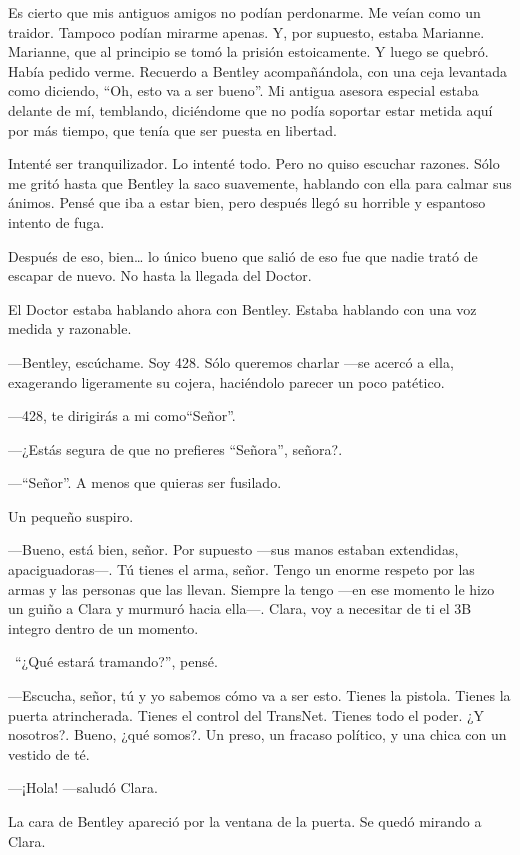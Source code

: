 Es cierto que mis antiguos amigos no podían perdonarme. Me veían como un
traidor. Tampoco podían mirarme apenas. Y, por supuesto, estaba
Marianne. Marianne, que al principio se tomó la prisión estoicamente. Y
luego se quebró. Había pedido verme. Recuerdo a Bentley acompañándola,
con una ceja levantada como diciendo, ``Oh, esto va a ser bueno''. Mi
antigua asesora especial estaba delante de mí, temblando, diciéndome que
no podía soportar estar metida aquí por más tiempo, que tenía que ser
puesta en libertad.

Intenté ser tranquilizador. Lo intenté todo. Pero no quiso escuchar
razones. Sólo me gritó hasta que Bentley la saco suavemente, hablando
con ella para calmar sus ánimos. Pensé que iba a estar bien, pero
después llegó su horrible y espantoso intento de fuga.

Después de eso, bien\ldots{} lo único bueno que salió de eso fue que
nadie trató de escapar de nuevo. No hasta la llegada del Doctor.

El Doctor estaba hablando ahora con Bentley. Estaba hablando con una voz
medida y razonable.

---Bentley, escúchame. Soy 428. Sólo queremos charlar ---se acercó a
ella, exagerando ligeramente su cojera, haciéndolo parecer un poco
patético.

---428, te dirigirás a mi como``Señor''.

---¿Estás segura de que no prefieres ``Señora'', señora?.

---``Señor''. A menos que quieras ser fusilado.

Un pequeño suspiro.

---Bueno, está bien, señor. Por supuesto ---sus manos estaban
extendidas, apaciguadoras---. Tú tienes el arma, señor. Tengo un enorme
respeto por las armas y las personas que las llevan. Siempre la tengo
---en ese momento le hizo un guiño a Clara y murmuró hacia ella---.
Clara, voy a necesitar de ti el 3B integro dentro de un momento.

~``¿Qué estará tramando?'', pensé.

---Escucha, señor, tú y yo sabemos cómo va a ser esto. Tienes la
pistola. Tienes la puerta atrincherada. Tienes el control del TransNet.
Tienes todo el poder. ¿Y nosotros?. Bueno, ¿qué somos?. Un preso, un
fracaso político, y una chica con un vestido de té.

---¡Hola! ---saludó Clara.

La cara de Bentley apareció por la ventana de la puerta. Se quedó
mirando a Clara.

